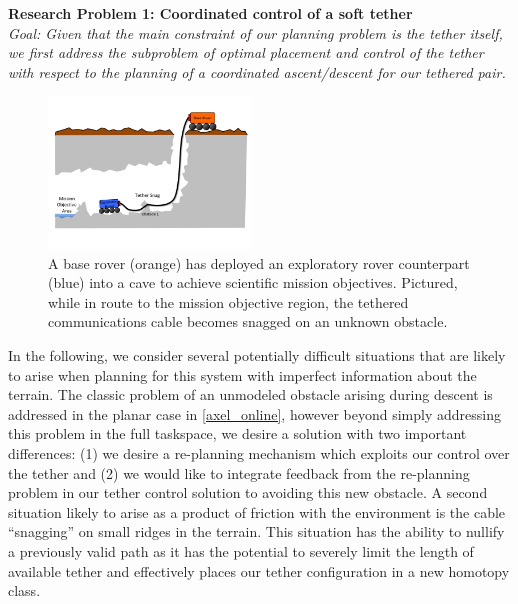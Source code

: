 \documentclass[12pt]{article}
\begin{document}
{\bf Research Problem 1: Coordinated control of a soft tether \\}
{\sl Goal: Given that the main constraint of our planning problem is the tether itself, we first 
address the subproblem of optimal placement and control of the tether with respect to the planning of 
a coordinated ascent/descent for our tethered pair. }
\begin{figure}
  \begin{center}
    \vspace{-0.5in}
    \includegraphics[width=0.48\textwidth, right]{cave_exploration}
  \end{center}
  \vspace{-0.5in}
  \label{fig:cave}
  \caption{A base rover (orange) has deployed an exploratory rover counterpart (blue) into a cave to achieve scientific mission objectives. Pictured, while in route to the mission objective region, the tethered communications cable becomes snagged on an unknown obstacle.}
\end{figure}
\vspace{-0.15in}



In the following, we consider several potentially difficult situations that are likely 
to arise when planning for this system with imperfect information about the terrain. The classic problem 
of an unmodeled obstacle arising during descent is addressed in the planar case in \ref{axel_online}, however beyond 
simply addressing this problem in the full taskspace, we 
desire a solution with two important differences: (1) we desire a re-planning mechanism which exploits 
our control over the tether and (2) we would like to integrate feedback from the re-planning problem 
in our tether control solution to avoiding this new obstacle. A second situation likely to arise as a product 
of friction with the environment is the cable ``snagging'' on small ridges in the terrain. This situation 
has the ability to nullify a previously valid path as it has the potential to severely limit the length 
of available tether and effectively places our tether configuration in a new homotopy class.
\end{document}
